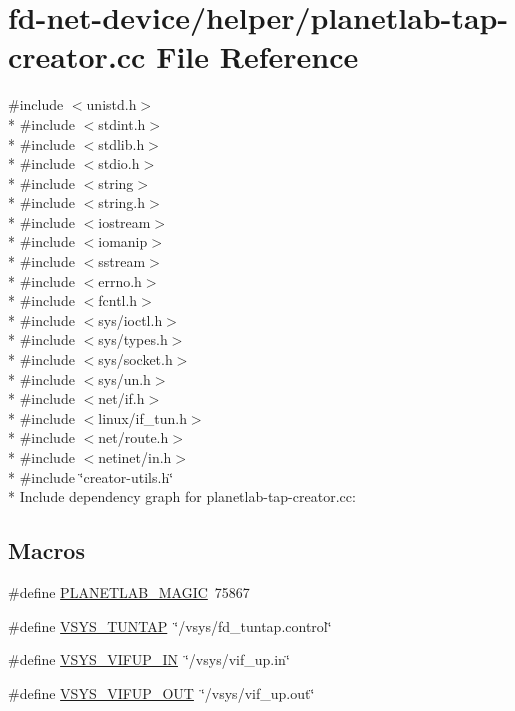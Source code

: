 \hypertarget{planetlab-tap-creator_8cc}{}\section{fd-\/net-\/device/helper/planetlab-\/tap-\/creator.cc File Reference}
\label{planetlab-tap-creator_8cc}
{\ttfamily \#include $<$unistd.\+h$>$}\\*
{\ttfamily \#include $<$stdint.\+h$>$}\\*
{\ttfamily \#include $<$stdlib.\+h$>$}\\*
{\ttfamily \#include $<$stdio.\+h$>$}\\*
{\ttfamily \#include $<$string$>$}\\*
{\ttfamily \#include $<$string.\+h$>$}\\*
{\ttfamily \#include $<$iostream$>$}\\*
{\ttfamily \#include $<$iomanip$>$}\\*
{\ttfamily \#include $<$sstream$>$}\\*
{\ttfamily \#include $<$errno.\+h$>$}\\*
{\ttfamily \#include $<$fcntl.\+h$>$}\\*
{\ttfamily \#include $<$sys/ioctl.\+h$>$}\\*
{\ttfamily \#include $<$sys/types.\+h$>$}\\*
{\ttfamily \#include $<$sys/socket.\+h$>$}\\*
{\ttfamily \#include $<$sys/un.\+h$>$}\\*
{\ttfamily \#include $<$net/if.\+h$>$}\\*
{\ttfamily \#include $<$linux/if\+\_\+tun.\+h$>$}\\*
{\ttfamily \#include $<$net/route.\+h$>$}\\*
{\ttfamily \#include $<$netinet/in.\+h$>$}\\*
{\ttfamily \#include \char`\"{}creator-\/utils.\+h\char`\"{}}\\*
Include dependency graph for planetlab-\/tap-\/creator.cc\+:
\subsection*{Macros}
\begin{DoxyCompactItemize}
\item 
\#define \hyperlink{planetlab-tap-creator_8cc_a15008ade4323f5ef598ad5a66b141e42}{P\+L\+A\+N\+E\+T\+L\+A\+B\+\_\+\+M\+A\+G\+IC}~75867
\item 
\#define \hyperlink{planetlab-tap-creator_8cc_a7339635e214db22b4901147cb0fff127}{V\+S\+Y\+S\+\_\+\+T\+U\+N\+T\+AP}~\char`\"{}/vsys/fd\+\_\+tuntap.\+control\char`\"{}
\item 
\#define \hyperlink{planetlab-tap-creator_8cc_a3aa8cf5ffef50a41424e2be785ce8316}{V\+S\+Y\+S\+\_\+\+V\+I\+F\+U\+P\+\_\+\+IN}~\char`\"{}/vsys/vif\+\_\+up.\+in\char`\"{}
\item 
\#define \hyperlink{planetlab-tap-creator_8cc_ab0d61c91eabfa43c0e4b7ed6ce85e0b2}{V\+S\+Y\+S\+\_\+\+V\+I\+F\+U\+P\+\_\+\+O\+UT}~\char`\"{}/vsys/vif\+\_\+up.\+out\char`\"{}
\end{DoxyCompactItemize}
